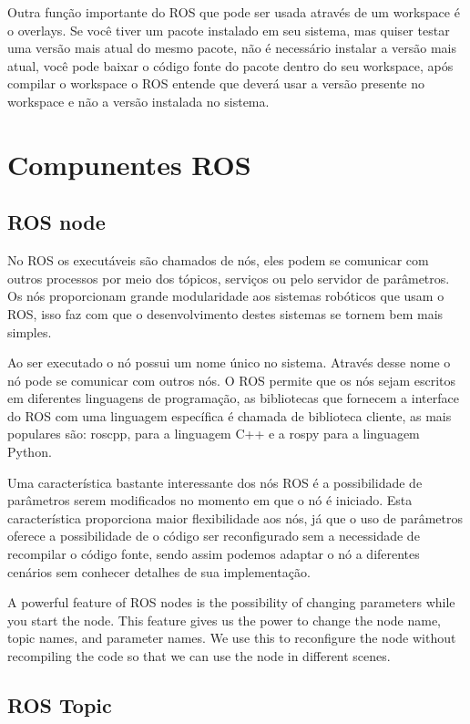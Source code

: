 Outra função importante do ROS que pode ser usada através de um workspace é o overlays. Se você tiver um pacote instalado em seu sistema, mas quiser testar uma versão mais atual do mesmo pacote, não é necessário instalar a versão mais atual, você pode baixar o código fonte do pacote dentro do seu workspace, após compilar o workspace o ROS entende que deverá usar a versão presente no workspace e não a versão instalada no sistema.


\section{Compunentes ROS}

\subsection{ROS node}
No ROS os executáveis são chamados de nós, eles podem se comunicar com outros processos por meio dos tópicos, serviços ou pelo servidor de parâmetros. Os nós proporcionam grande modularidade aos sistemas robóticos que usam o ROS, isso faz com que o desenvolvimento destes sistemas se tornem bem mais simples.

Ao ser executado o nó possui um nome único no sistema. Através desse nome o nó pode se comunicar com outros nós. O ROS permite que os nós sejam escritos em diferentes linguagens de programação, as bibliotecas que fornecem a interface do ROS com uma linguagem específica é chamada de biblioteca cliente, as mais populares são: roscpp, para a linguagem C++ e a rospy para a linguagem Python.

Uma característica bastante interessante dos nós ROS é a possibilidade de parâmetros serem modificados no momento em que o nó é iniciado. Esta característica proporciona maior flexibilidade aos nós, já que o uso de parâmetros oferece a possibilidade de o código ser reconfigurado sem a necessidade de recompilar o código fonte, sendo assim podemos adaptar o nó a diferentes cenários sem conhecer detalhes de sua implementação. 


A powerful feature of ROS nodes is the possibility of changing parameters while you start the node. This feature gives us the power to change the node name, topic names, and parameter names. We use this to reconfigure the node without recompiling the code so that we can use the node in different scenes.


\subsection{ROS Topic}

